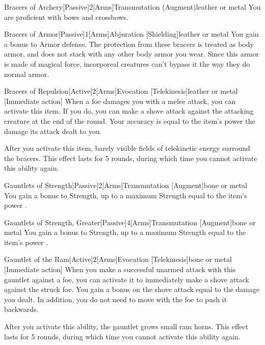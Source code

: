 \begin{magicitemdef}{Bracers of Archery}[Passive]{2}[Arms]{Transmutation (Augment)}{leather or metal}
     You are proficient with bows and crossbows.
\end{magicitemdef}

\begin{magicitemdef}{Bracers of Armor}[Passive]{1}[Arms]{Abjuration [Shielding]}{leather or metal}
     You gain a  bonus to Armor defense.
    The protection from these bracers is treated as body armor, and does not stack with any other body armor you wear.
    Since this armor is made of magical force, incorporeal creatures can't bypass it the way they do normal armor.
\end{magicitemdef}

\begin{magicitemdef}{Bracers of Repulsion}[Active]{2}[Arms]{Evocation [Telekinesis]}{leather or metal}
    [Immediate action] When a foe damages you with a melee attack, you can activate this item.
    If you do, you can make a shove attack against the attacking creature at the end of the round.
    Your accuracy is equal to the item's power \add the damage its attack dealt to you.

    After you activate this item, barely visible fields of telekinetic energy surround the bracers.
    This effect lasts for 5 rounds, during which time you cannot activate this ability again.
\end{magicitemdef}

\begin{magicitemdef}{Gauntlets of Strength}[Passive]{2}[Arms]{Transmutation [Augment]}{bone or metal}
     You gain a  bonus to Strength, up to a maximum Strength equal to the item's power .
\end{magicitemdef}

\begin{magicitemdef}{Gauntlets of Strength, Greater}[Passive]{4}[Arms]{Transmutation [Augment]}{bone or metal}
     You gain a  bonus to Strength, up to a maximum Strength equal to the item's power .
\end{magicitemdef}

\begin{magicitemdef}{Gauntlet of the Ram}[Active]{2}[Arms]{Evocation [Telekinesis]}{bone or metal}
    [Immediate action] When you make a successful unarmed attack with this gauntlet against a foe, you can activate it to immediately make a shove attack against the struck foe.
    You gain a bonus on the shove attack equal to the damage you dealt.
    In addition, you do not need to move with the foe to push it backwards.

    After you activate this ability, the gauntlet grows small ram horns.
    This effect lasts for 5 rounds, during which time you cannot activate this ability again.
\end{magicitemdef}

